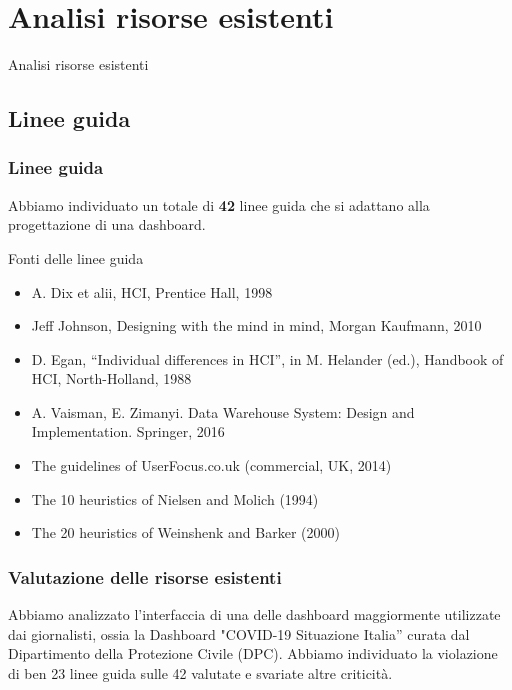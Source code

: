 \documentclass[handout]{beamer}
\begin{document}
	\section{Analisi risorse esistenti}
		\begin{frame}
			\centering
			\begin{Huge}
				Analisi risorse esistenti
			\end{Huge}
		\end{frame}

		\subsection{Linee guida}

			\begin{frame}
	 			\frametitle{Linee guida}
				Abbiamo individuato un totale di \textbf{42} linee guida che si adattano alla progettazione di una dashboard.
				\begin{block}{Fonti delle linee guida}
					\begin{itemize}[<+->]
						\item A. Dix et alii, HCI, Prentice Hall, 1998\\
						\item Jeff Johnson, Designing with the mind in mind, Morgan Kaufmann, 2010\\
						\item D. Egan, “Individual differences in HCI”, in M. Helander (ed.), Handbook of HCI, North-Holland, 1988\\
						\item A. Vaisman, E. Zimanyi. Data Warehouse System: Design and Implementation. Springer, 2016\\
						\item The guidelines of UserFocus.co.uk (commercial, UK, 2014)\\
						\item The 10 heuristics of Nielsen and Molich (1994)\\
						\item The 20 heuristics of Weinshenk and Barker (2000)\\
					\end{itemize}
				\end{block}
			\end{frame}
		
			\begin{frame}
				\frametitle{Valutazione delle risorse esistenti}
				Abbiamo analizzato l'interfaccia di una delle dashboard maggiormente utilizzate dai giornalisti, ossia la Dashboard "COVID-19 Situazione Italia'' curata dal Dipartimento della Protezione Civile (DPC). \newline \newline
				Abbiamo individuato la violazione di ben 23 linee guida sulle 42 valutate e svariate altre criticità. 
			\end{frame}
\end{document}
